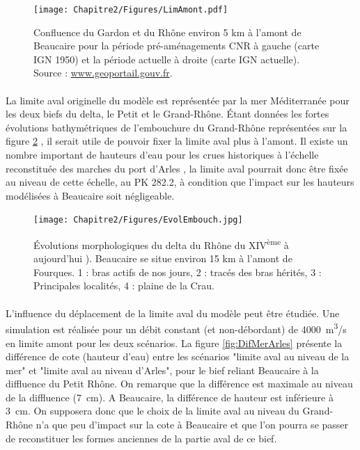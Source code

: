 	 \begin{figure}[h!]
		\centering
	    \texttt{[image: Chapitre2/Figures/LimAmont.pdf]}
        \caption{Confluence du Gardon et du Rhône environ 5 km à l'amont de Beaucaire pour la période pré-aménagements CNR à gauche (carte IGN 1950) et la période actuelle à droite (carte IGN actuelle). Source : \url{www.geoportail.gouv.fr}.}
		\label{fig:LimAmont}
	\end{figure}
	 
\FloatBarrier	 
	 
	\paragraph{} La limite aval originelle du modèle est représentée par la mer Méditerranée pour les deux biefs du delta, le Petit et le Grand-Rhône. Étant données les fortes évolutions bathymétriques de l'embouchure du Grand-Rhône représentées sur la figure \ref{fig:Embouch} \citep{pichard_les_2014}, il serait utile de pouvoir fixer la limite aval plus à l'amont. Il existe un nombre important de hauteurs d'eau pour les crues historiques à l'échelle reconstituée des marches du port d'Arles \citep{pichard_les_1995}, la limite aval pourrait donc être fixée au niveau de cette échelle, au PK 282.2, à condition que l'impact sur les hauteurs modélisées à Beaucaire soit négligeable.
	
	\begin{figure}[h]
		\centering
	    \texttt{[image: Chapitre2/Figures/EvolEmbouch.jpg]}
        \caption{Évolutions morphologiques du delta du Rhône du XIV\textsuperscript{ème} à aujourd'hui \citep{pichard_les_2014}). Beaucaire se situe environ 15 km à l'amont de Fourques. 1 : bras actifs de nos jours, 2 : tracés des bras hérités, 3 : Principales localités, 4 : plaine de la Crau.}
		\label{fig:Embouch}
	\end{figure}

	\paragraph{} L'influence du déplacement de la limite aval du modèle peut être étudiée. Une simulation est réalisée pour un débit constant (et non-débordant) de 4000~m\textsuperscript{3}/s en limite amont pour les deux scénarios. La figure \ref{fig:DifMerArles} présente la différence de cote (hauteur d'eau) entre les scénarios "limite aval au niveau de la mer" et "limite aval au niveau d'Arles", pour le bief reliant Beaucaire à la diffluence du Petit Rhône. On remarque que la différence est maximale au niveau de la diffluence (7~cm). A Beaucaire, la différence de hauteur est inférieure à 3~cm. On supposera donc que le choix de la limite aval au niveau du Grand-Rhône n'a que peu d'impact sur la cote à Beaucaire et que l'on pourra se passer de reconstituer les formes anciennes de la partie aval de ce bief. 
	 

